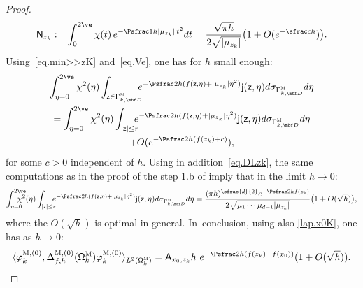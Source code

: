 \begin{proof}
\begin{align}
\mathsf N_{z_k}:=\int_0^{2\ve}\chi(t)\, e^{-\Psfrac 1h\vert \mu_{z_k}\vert \, t^2} dt=\frac{\sqrt{\pi h} }{2\sqrt{\vert \mu_{z_k}\vert}} \bigl(1+O(e^{-\sfrac ch})\bigr).
\end{align}
Using~\eqref{eq.min>>zK} and~\eqref{eq.Ve}, one has for $h$ small enough:\vspace*{-3pt}
\begin{multline*}
\int_{\eta=0}^{2\ve} \chi^2(\eta) \int_{\mathsf z \in \Gamma_{k,\mbf
D}^{\textsc{M}} } \!\! \!\! e^{-\Psfrac 2h
(f(\mathsf z,\eta) +\vert \mu_{z_k}\vert \eta^2)}
\mathsf j(\mathsf z,\eta)d\sigma
_{\Gamma^{\textsc{M}}_{k,\mbf D}} d\eta\\
= \int_{\eta=0}^{2\ve} \chi^2(\eta) \int_{|\mathsf z |\le r } \!\! \!\! e^{-\Psfrac 2h (f(\mathsf z,\eta) +\vert \mu_{z_k}\vert \eta^2)} \mathsf j(\mathsf z,\eta) d\sigma _{\Gamma^{\textsc{M}}_{k,\mbf D}} d\eta \\
+O(e^{-\Psfrac 2h (f(z_k)+c)}),
\end{multline*}
for some $c>0$ independent of $h$.
Using in addition~\eqref{eq.DLzk}, the same computations as in the proof of the step 1.b of \cite[Prop.\,24]{DoNe2} imply that in the limit $h\to 0$:\vspace*{-3pt}
\[
\int_{\eta=0}^{2\ve} \!\!\! \!\!\! \!\!\chi^2(\eta) \int_{|\mathsf z |\le r } \!\! \!\! e^{-\Psfrac 2h (f(\mathsf z,\eta) +\vert \mu_{z_k}\vert \eta^2)} \mathsf j(\mathsf z,\eta) d\sigma _{\Gamma^{\textsc{M}}_{k,\mbf D}} d\eta =\frac{ (\pi h)^{\sfrac{d}{2} } e^{-\Psfrac 2h f(z_k)}}{2\sqrt{\mu_1 \cdots \mu_{d-1} \vert \mu_{z_k}\vert}}
\bigl(1+ O (\sqrt h) \bigr),
\]
where the $O (\sqrt h)$ is optimal in general. In~conclusion, using also \eqref{lap.x0K}, one has as $h\to 0$:
\begin{equation}\label{eq.Ax0ps}
\langle \varphi^{\textsc{M},(0)}_k,\Delta_{f,h}^{\textsc{M}, (0)}(\mathsf \Omega_k^{\textsc{M}}) \varphi^{\textsc{M},(0)}_k \rangle_{L^2(\mathsf \Omega_k^{\textsc{M}})}= \mathsf A_{x_0,z_k}h \ e^{-\Psfrac 2h (f(z_k)-f(x_0))} (1+O(\sqrt h)).
\end{equation}


\end{proof}
